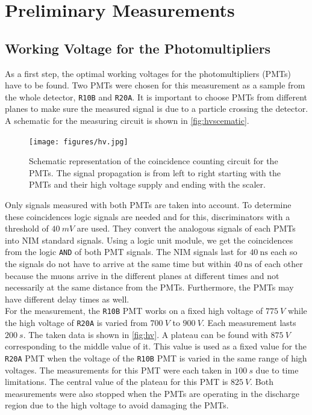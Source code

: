\chapter{Preliminary Measurements}
\label{sec:prem}
\section{Working Voltage for the Photomultipliers}
As a first step, the optimal working voltages for the photomultipliers (PMTs) have to be found.
Two PMTs were chosen for this measurement as a sample from the whole detector, \texttt{R10B} and \texttt{R20A}.
It is important to choose PMTs from different planes to make sure the measured signal is due to a 
particle crossing the detector. A schematic for the measuring circuit is shown in \autoref{fig:hvscematic}.\\
\begin{figure}
    \centering 
    \texttt{[image: figures/hv.jpg]}
    \caption{Schematic representation of the coincidence counting circuit for the PMTs. 
    The signal propagation is from left to right starting with the PMTs and their high voltage supply and ending with the scaler.}
    \label{fig:hvscematic}
\end{figure}
Only signals measured with both PMTs are taken into account. To determine these coincidences 
logic signals are needed and for this, discriminators with a threshold of $\SI{40}{mV}$ are used. 
They convert the analogous signals of each PMTs into NIM standard signals. Using a logic unit module, we get
the coincidences from the logic \texttt{AND} of both PMT signals. The NIM signals 
last for $\SI{40}{\ns}$ each so the signals do not have to arrive at the same time but within 
$\SI{40}{\ns}$ of each other because the muons arrive in the different planes at different times 
and not necessarily at the same distance from the PMTs. Furthermore, the PMTs may have different
delay times as well.\\
For the measurement, the \texttt{R10B} PMT works on a fixed high voltage of $\SI{775}{V}$ while the high voltage of 
\texttt{R20A} is varied from $\SI{700}{V}$ to $\SI{900}{V}$. Each measurement lasts $\SI{200}{s}$.
The taken data is shown in \autoref{fig:hv}. A plateau can be found with $\SI{875}{V}$ corresponding to the middle value 
of it. This value is used as a fixed value for the \texttt{R20A} PMT when the voltage of the \texttt{R10B}
PMT is varied in the same range of high voltages. The measurements for this PMT were each taken in $\SI{100}{s}$ due to 
time limitations.
The central value of the plateau for this PMT is $\SI{825}{V}$.
Both measurements were also stopped when the PMTs are operating in the discharge region due to the high voltage to avoid damaging the PMTs.\\

